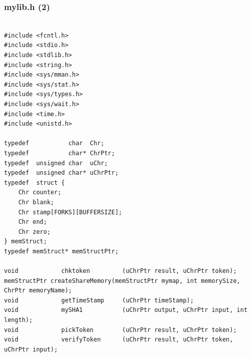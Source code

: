 \documentclass[aspectratio=169, xcolor=table, notheorems, hyperref={pdfpagelabels=false}]{beamer}
\begin{document}
\begin{frame}[fragile]
\frametitle{mylib.h (2)}
\begin{lstlisting}[basicstyle=\ttfamily\tiny]         % 108

#include <fcntl.h>
#include <stdio.h>
#include <stdlib.h>
#include <string.h>
#include <sys/mman.h>
#include <sys/stat.h>
#include <sys/types.h>
#include <sys/wait.h>
#include <time.h>
#include <unistd.h>

typedef           char  Chr;
typedef           char* ChrPtr;
typedef  unsigned char  uChr;
typedef  unsigned char* uChrPtr;
typedef  struct {
    Chr counter;
    Chr blank;
    Chr stamp[FORKS][BUFFERSIZE];
    Chr end;
    Chr zero;
} memStruct;
typedef memStruct* memStructPtr;

void            chktoken         (uChrPtr result, uChrPtr token);
memStructPtr createShareMemory(memStructPtr mymap, int memorySize, ChrPtr memoryName);
void            getTimeStamp     (uChrPtr timeStamp);
void            mySHA1           (uChrPtr output, uChrPtr input, int length);
void            pickToken        (uChrPtr result, uChrPtr token);
void            verifyToken      (uChrPtr result, uChrPtr token, uChrPtr input);

\end{lstlisting}
\end{frame}
\end{document}
